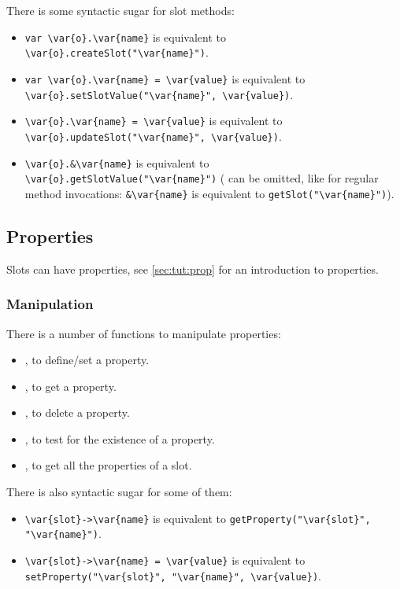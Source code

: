 There is some syntactic sugar for slot methods:
\begin{itemize}
\item \lstinline|var \var{o}.\var{name}| is equivalent to
  \lstinline[style=varInString]|\var{o}.createSlot("\var{name}")|.
\item \lstinline|var \var{o}.\var{name} = \var{value}| is equivalent to
  \lstinline[style=varInString]|\var{o}.setSlotValue("\var{name}", \var{value})|.
\item \lstinline|\var{o}.\var{name} = \var{value}| is equivalent to
  \lstinline[style=varInString]|\var{o}.updateSlot("\var{name}", \var{value})|.
\item \lstinline|\var{o}.&\var{name}| is equivalent to
  \lstinline[style=varInString]|\var{o}.getSlotValue("\var{name}")| ( can
  be omitted, like for regular method invocations: \lstinline|&\var{name}|
  is equivalent to \lstinline[style=varInString]|getSlot("\var{name}")|).
\end{itemize}


\subsection{Properties}
\label{sec:lang:prop}


Slots can have properties, see \autoref{sec:tut:prop} for an introduction to
properties.

\subsubsection{Manipulation}

There is a number of functions to manipulate properties:
\begin{itemize}
\item {}, to define/set a property.
\item {}, to get a property.
\item {}, to delete a property.
\item {}, to test for the existence of a
  property.
\item {}, to get all the properties of a slot.
\end{itemize}

There is also syntactic sugar for some of them:

\begin{itemize}
\item \lstinline|\var{slot}->\var{name}| is equivalent to
  \lstinline[style=varInString]|getProperty("\var{slot}", "\var{name}")|.
\item \lstinline|\var{slot}->\var{name} = \var{value}| is equivalent to
  \lstinline[style=varInString]|setProperty("\var{slot}", "\var{name}", \var{value})|.
\end{itemize}


